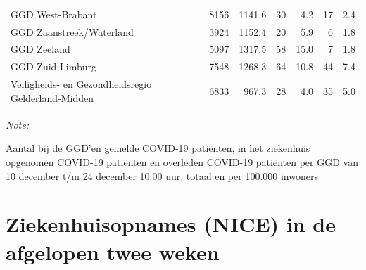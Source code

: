 \documentclass[
  english,
  man,floatsintext]{apa6}
\begin{document}
\begin{table}
\begin{threeparttable}
\begin{tabular}{lrrrrrr}
GGD West-Brabant & 8156 & 1141.6 & 30 & 4.2 & 17 & 2.4\\
GGD Zaanstreek/Waterland & 3924 & 1152.4 & 20 & 5.9 & 6 & 1.8\\
GGD Zeeland & 5097 & 1317.5 & 58 & 15.0 & 7 & 1.8\\
GGD Zuid-Limburg & 7548 & 1268.3 & 64 & 10.8 & 44 & 7.4\\
Veiligheids- en Gezondheidsregio Gelderland-Midden & 6833 & 967.3 & 28 & 4.0 & 35 & 5.0\\
\bottomrule
\end{tabular}
\begin{tablenotes}
\item \textit{Note: } 
\item Aantal bij de GGD’en gemelde COVID-19 patiënten, in het ziekenhuis opgenomen COVID-19 patiënten en overleden COVID-19 patiënten per GGD van 10 december t/m 24 december 10:00 uur, totaal en per 100.000 inwoners
\end{tablenotes}
\end{threeparttable}
\endgroup{}
\end{table}

\newpage

\hypertarget{ziekenhuisopnames-nice-in-de-afgelopen-twee-weken}{%
\section{Ziekenhuisopnames (NICE) in de afgelopen twee weken}\label{ziekenhuisopnames-nice-in-de-afgelopen-twee-weken}}
\end{document}
